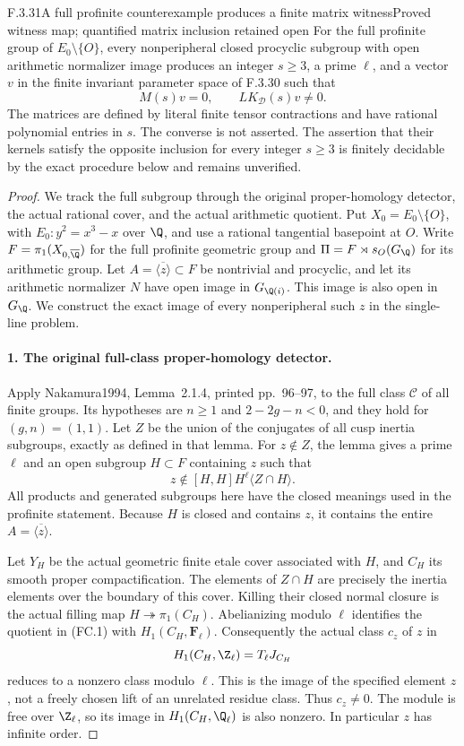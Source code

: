 \begin{result}{F.3.31}{A full profinite counterexample produces a finite matrix witness}{Proved witness map; quantified matrix inclusion retained open}
For the full profinite group of $E_0\setminus\{O\}$, every
nonperipheral closed procyclic subgroup with open arithmetic
normalizer image produces an integer $s\geq3$, a prime $\ell$,
and a vector $v$ in the finite invariant parameter space of
F.3.30 such that
\[
 M(s)v=0,\qquad LK_{\mathcal D}(s)v\ne0.
\]
The matrices are defined by literal finite tensor contractions
and have rational polynomial entries in $s$. The converse is
not asserted. The assertion that their kernels satisfy the
opposite inclusion for every integer $s\geq3$ is finitely
decidable by the exact procedure below and remains unverified.
\end{result}
\begin{proof}
We track the full subgroup through the original proper-homology detector, the actual rational cover, and the actual arithmetic quotient.
Put $X_0=E_0\setminus\{O\}$, with
$E_0:y^2=x^3-x$ over $\Q$, and use a rational tangential
basepoint at $O$. Write $F=\pi_1(X_{0,\overline\Q})$ for
the full profinite geometric group and
$\Pi=F\rtimes s_O(G_\Q)$ for its arithmetic group.
Let $A=\overline{\langle z\rangle}\subset F$ be nontrivial
and procyclic, and let its arithmetic normalizer $N$
have open image in $G_{\Q(i)}$. This image is also open
in $G_\Q$. We construct the exact image of every
nonperipheral such $z$ in the single-line problem.

\paragraph{1. The original full-class proper-homology detector.}
Apply Nakamura1994, Lemma~2.1.4, printed pp.~96--97,
to the full class $\mathcal C$ of all finite groups\cite{AuditNakamura1994}.
Its hypotheses are $n\geq1$ and $2-2g-n<0$, and they
hold for $(g,n)=(1,1)$. Let $Z$ be the union of the
conjugates of all cusp inertia subgroups, exactly as
defined in that lemma. For $z\notin Z$, the lemma gives
a prime $\ell$ and an open subgroup $H\subset F$
containing $z$ such that
\[
             z\notin [H,H]H^\ell\langle Z\cap H\rangle .    \tag{FC.1}
\]
All products and generated subgroups here have the
closed meanings used in the profinite statement.
Because $H$ is closed and contains $z$, it contains
the entire $A=\overline{\langle z\rangle}$.

Let $Y_H$ be the actual geometric finite etale cover
associated with $H$, and $C_H$ its smooth proper
compactification. The elements of $Z\cap H$ are
precisely the inertia elements over the boundary
of this cover. Killing their closed normal closure
is the actual filling map
$H\twoheadrightarrow\pi_1(C_H)$. Abelianizing modulo
$\ell$ identifies the quotient in (FC.1) with
$H_1(C_H,\mathbf F_\ell)$. Consequently the actual
class $c_z$ of $z$ in
\[
                    H_1(C_H,\Z_\ell)=T_\ell J_{C_H}
\]
reduces to a nonzero class modulo $\ell$.
This is the image of the specified element $z$,
not a freely chosen lift of an unrelated residue
class. Thus $c_z\ne0$. The module is free over
$\Z_\ell$, so its image in
$H_1(C_H,\Q_\ell)$ is also nonzero.
In particular $z$ has infinite order.


\end{proof}
